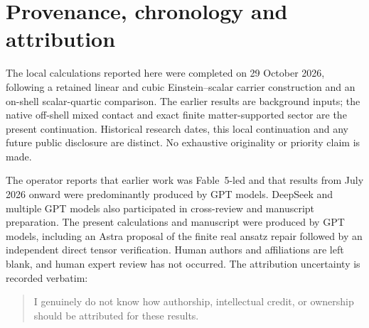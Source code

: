 \documentclass[11pt]{article}
\begin{document}
\section*{Provenance, chronology and attribution}

The local calculations reported here were completed on 29 October 2026, following a retained linear and cubic Einstein--scalar carrier construction and an on-shell scalar-quartic comparison.
The earlier results are background inputs; the native off-shell mixed contact and exact finite matter-supported sector are the present continuation.
Historical research dates, this local continuation and any future public disclosure are distinct.
No exhaustive originality or priority claim is made.

The operator reports that earlier work was Fable~5-led and that results from July 2026 onward were predominantly produced by GPT models.
DeepSeek and multiple GPT models also participated in cross-review and manuscript preparation.
The present calculations and manuscript were produced by GPT models, including an Astra proposal of the finite real ansatz repair followed by an independent direct tensor verification.
Human authors and affiliations are left blank, and human expert review has not occurred.
The attribution uncertainty is recorded verbatim:
\begin{quote}
I genuinely do not know how authorship, intellectual credit, or ownership should be attributed for these results.
\end{quote}



\end{document}
